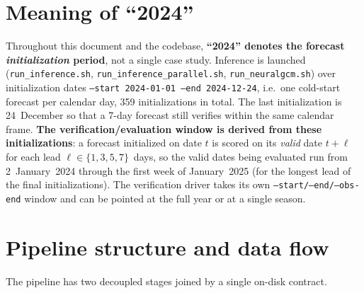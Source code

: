 \documentclass[11pt]{article}
\newcommand{\code}[1]{\texttt{\small #1}}
\begin{document}
\section{Meaning of ``2024''}

Throughout this document and the codebase, \textbf{``2024'' denotes the forecast
\emph{initialization} period}, not a single case study. Inference is launched
(\code{run\_inference.sh}, \code{run\_inference\_parallel.sh},
\code{run\_neuralgcm.sh}) over initialization dates
\code{--start 2024-01-01 --end 2024-12-24}, i.e.\ one cold-start forecast per
calendar day, \num{359} initializations in total. The last initialization is
24~December so that a 7-day forecast still verifies within the same calendar
frame. \textbf{The verification/evaluation window is derived from these
initializations}: a forecast initialized on date $t$ is scored on its
\emph{valid} date $t+\ell$ for each lead $\ell\in\{1,3,5,7\}$~days, so the valid
dates being evaluated run from 2~January~2024 through the first week of
January~2025 (for the longest lead of the final initializations). The
verification driver takes its own \code{--start/--end/--obs-end} window and can
be pointed at the full year or at a single season.

\section{Pipeline structure and data flow}

The pipeline has two decoupled stages joined by a single on-disk contract.
\end{document}
